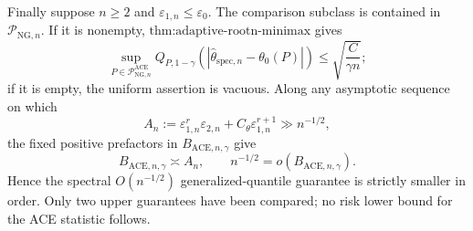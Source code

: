 Finally suppose \(n\ge2\) and \(\varepsilon_{1,n}\le\varepsilon_0\).  The comparison subclass is contained in \(\mathcal P_{\mathrm{NG},n}\).  If it is nonempty, \(\text{thm:adaptive-rootn-minimax}\) gives
\[
 \sup_{P\in\mathcal P_{\mathrm{NG},n}^{\mathrm{ACE}}}
 Q_{P,1-\gamma}(|\widehat\theta_{\mathrm{spec},n}-\theta_0(P)|)
 \le\sqrt{\frac{C}{\gamma n}};
\]
if it is empty, the uniform assertion is vacuous.  Along any asymptotic sequence on which
\[
 A_n:=\varepsilon_{1,n}^r\varepsilon_{2,n}
      +C_{\theta}\varepsilon_{1,n}^{r+1}
 \gg n^{-1/2},
\]
the fixed positive prefactors in \(B_{\mathrm{ACE},n,\gamma}\) give
\[
 B_{\mathrm{ACE},n,\gamma}\asymp A_n,
 \qquad
 n^{-1/2}=o(B_{\mathrm{ACE},n,\gamma}).
\]
Hence the spectral \(O(n^{-1/2})\) generalized-quantile guarantee is strictly smaller in order.  Only two upper guarantees have been compared; no risk lower bound for the ACE statistic follows.